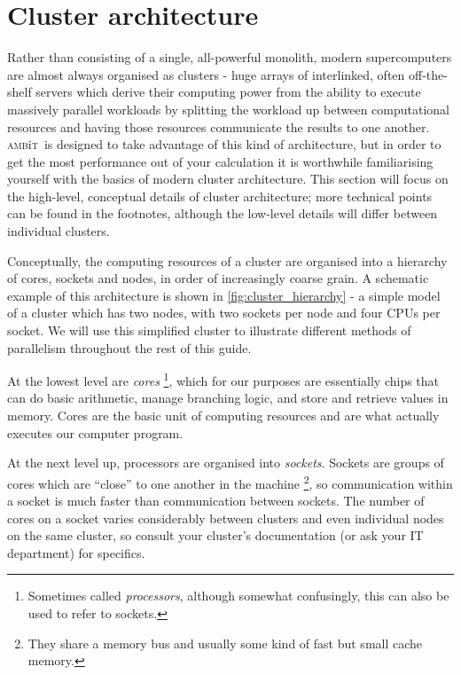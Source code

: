 \documentclass{report}
\newcommand{\ambit}{\textsc{amb}{\footnotesize i}\textsc{t}}
\begin{document}
\section{Cluster architecture}
\label{sec:cluster_architecture}

Rather than consisting of a single, all-powerful monolith, modern supercomputers are almost always
organised as clusters - huge arrays of interlinked, often off-the-shelf servers which derive their 
computing power from the ability to execute massively parallel workloads by splitting the workload up
between computational resources and having those resources communicate the results to one another. 
\ambit ~is designed to take advantage of this kind of architecture, but in order to get the most 
performance out of your calculation it is worthwhile familiarising yourself with the basics of modern 
cluster architecture. This section will focus on the high-level, conceptual details of cluster
architecture; more technical points can be found in the footnotes, although the low-level details will
differ between individual clusters.

Conceptually, the computing resources of a cluster are organised into a hierarchy of cores, sockets and
nodes, in order of increasingly coarse grain. A schematic example of this architecture is shown 
in \ref{fig:cluster_hierarchy} - a simple model of a cluster which has two nodes, with two sockets per 
node and four CPUs per socket. We will use this simplified cluster to illustrate different methods of
parallelism throughout the rest of this guide.

At the 
lowest level are \textit{cores} \footnote{Sometimes called \textit{processors}, although somewhat 
confusingly, this can also be used to refer to sockets.}, which for our purposes are essentially chips 
that can do basic arithmetic, manage branching logic, and store and retrieve values in memory. Cores are 
the basic unit of computing resources and are what actually executes our computer program. 

At the next level up, processors are organised into \textit{sockets}. Sockets are groups of cores which are
``close'' to one another in the machine \footnote{They share a memory bus and usually some kind of fast
but small cache memory.}, so
communication within a socket is much faster than communication between sockets. The number of cores on a
socket varies considerably between clusters and even individual nodes on the same cluster, so consult 
your cluster's documentation (or ask your IT department) for specifics.
\end{document}
